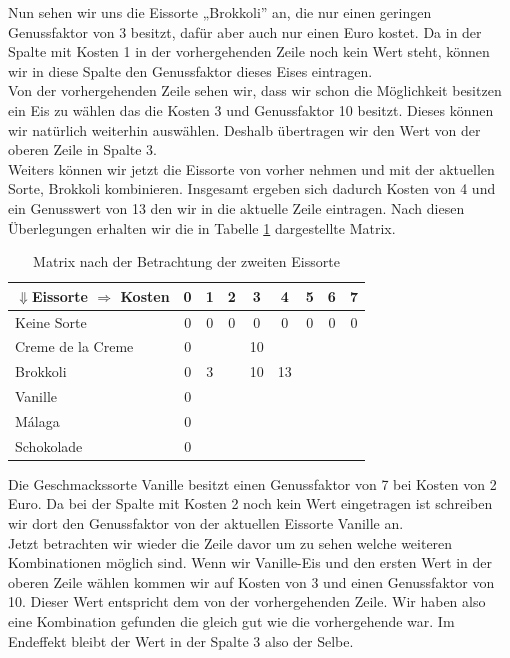 \documentclass[a4paper, 12pt]{article}
\begin{document}
Nun sehen wir uns die Eissorte „Brokkoli” an, die nur einen geringen
Genussfaktor von 3 besitzt, dafür aber auch nur einen Euro kostet. Da in der
Spalte mit Kosten 1 in der vorhergehenden Zeile noch kein Wert steht, können
wir in diese Spalte den Genussfaktor dieses Eises eintragen.\\

Von der vorhergehenden Zeile sehen wir, dass wir schon die Möglichkeit
besitzen ein Eis zu wählen das die Kosten 3 und Genussfaktor 10 besitzt.
Dieses können wir natürlich weiterhin auswählen. Deshalb übertragen wir den
Wert von der oberen Zeile in Spalte 3.\\

Weiters können wir jetzt die Eissorte von vorher nehmen und mit der aktuellen
Sorte, Brokkoli kombinieren. Insgesamt ergeben sich dadurch Kosten von 4 und
ein Genusswert von 13 den wir in die aktuelle Zeile eintragen. Nach diesen
Überlegungen erhalten wir die in Tabelle \ref{table:2_Eis} dargestellte Matrix.

\begin{table}[H]
	\begin{center}
		\begin{tabular}{l|cccccccc}
			$⇓$Eissorte $⇒$ Kosten & 0 & 1 & 2 & 3 & 4 & 5 &
			6 & 7\\
			\hline
			Keine Sorte			& 0 & 0 & 0 & 0	 &	0 & 0	& 0 & 0 \\
			Creme de la Creme	& 0 &	&	& 10 &	  & &	&	\\
			Brokkoli			& 0 & 3 &	& 10 & 13 & &	&	\\
			Vanille				& 0 &	&	&	 &	  & &	&	\\
			Málaga				& 0 &	&	&	 &	  & &	&	\\
			Schokolade			& 0 &	&	&	 &	  & &	&	\\
		\end{tabular}
	\end{center}
\caption{Matrix nach der Betrachtung der zweiten Eissorte}
\label{table:2_Eis}
\end{table}

Die Geschmackssorte Vanille besitzt einen Genussfaktor von 7 bei Kosten von 2
Euro. Da bei der Spalte mit Kosten 2 noch kein Wert eingetragen ist schreiben
wir dort den Genussfaktor von der aktuellen Eissorte Vanille an.\\

Jetzt betrachten wir wieder die Zeile davor um zu sehen welche weiteren
Kombinationen möglich sind. Wenn wir Vanille-Eis und den ersten Wert in der
oberen Zeile wählen kommen wir auf Kosten von 3 und einen Genussfaktor von 10.
Dieser Wert entspricht dem von der vorhergehenden Zeile. Wir haben also eine
Kombination gefunden die gleich gut wie die vorhergehende war. Im Endeffekt
bleibt der Wert in der Spalte 3 also der Selbe.\\
\end{document}
